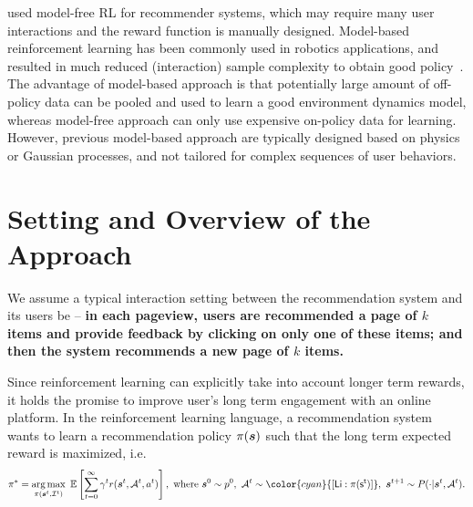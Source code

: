 \documentclass{article} %
\newcommand{\xc}[1]{{\color{blue}{\bf\sf [#1]}}}
\newcommand{\Li}[1]{{\color{cyan}{\bf\sf [Li: #1]}}}
\begin{document}
\cite{XiangyuLiangZhuoye18,zhao2018deep,zheng2018drn} used model-free RL for recommender systems, which may require many user interactions and the reward function is manually designed. Model-based reinforcement learning has been commonly used in robotics applications, and resulted in much reduced (interaction) sample complexity to obtain good policy~\citep{DeisenrothFox15,NagabandiKahn17,IgnasiPieter18}. The advantage of model-based approach is that potentially large amount of off-policy data can be pooled and used to learn a good environment dynamics model, whereas model-free approach can only use expensive on-policy data for learning. However, previous model-based approach are typically designed based on physics or Gaussian processes, and not tailored for complex sequences of user behaviors. 


\vspace{-3mm}
\section{Setting and Overview of the Approach}
\vspace{-3mm}

We assume a typical interaction setting between the recommendation system and its users be -- {\bf in each pageview, users are recommended a page of $k$ items and provide feedback by clicking on only one of these items; and then the system recommends a new page of $k$ items.}

Since reinforcement learning can explicitly take into account longer term rewards, it holds the promise to improve user's long term engagement with an online platform. In the reinforcement learning language, a recommendation system wants to learn a recommendation policy $\pi({\bm{s}})$ such that the long term expected reward is maximized, i.e.
{\small \begin{align}
    \pi^\ast = \argmax_{\pi(\vs^t,\gI^t)}~\E\left[\sum_{t=0}^{\infty} \gamma^t r(\vs^t, \gA^t, a^t)\right],~\text{where}~\vs^0\sim p^0,~\gA^t \sim \Li{\pi(s^{t})},~\vs^{t+1} \sim P(\cdot | \vs^t, \gA^t). 
    \label{eq:rl}
\end{align}}
\end{document}
